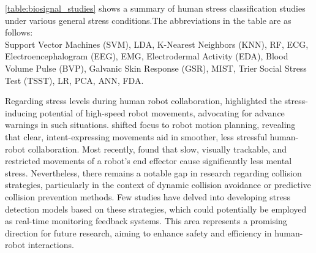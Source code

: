   \autoref{table:biosignal_studies} shows a summary of human stress classification studies under various general stress conditions.The abbreviations in the table are as follows:  \\
  Support Vector Machines (SVM), \gls{LDA}, K-Nearest Neighbors (KNN), \gls{RF}, \gls{ECG}, Electroencephalogram (EEG), \gls{EMG}, Electrodermal Activity (EDA), Blood Volume Pulse (BVP), Galvanic Skin Response (GSR), \gls{MIST}, Trier Social Stress Test (\gls{TSST}), \gls{LR}, \gls{PCA}, \gls{ANN}, \gls{FDA}.
  
  
  Regarding stress levels during human robot collaboration, \textcite{Arai2010-be}highlighted the stress-inducing potential of high-speed robot movements, advocating for advance warnings in such situations. \textcite{Dragan2015-vv} shifted focus to robot motion planning, revealing that clear, intent-expressing movements aid in smoother, less stressful human-robot collaboration. Most recently,\textcite{Lu2022-kj} found that slow, visually trackable, and restricted movements of a robot's end effector cause significantly less mental stress. Nevertheless, there remains a notable gap in research regarding collision strategies, particularly in the context of dynamic collision avoidance or predictive collision prevention methods. Few studies have delved into developing stress detection models based on these strategies, which could potentially be employed as real-time monitoring feedback systems. This area represents a promising direction for future research, aiming to enhance safety and efficiency in human-robot interactions.
  




\begin{comment}
subsection*{Physiological indicators of mental stress}
ome studies focus on reviewing the current state of affairs related to human stress detection. For instance, a review on human stress detection using bio-signals is presented in (Giannakakis et al., 2019). However, a discussion about the psychological, physical, and behavioral measures of human stress is found lacking. Further, publicly available databases for human stress measurement were also not explored. In another study, objective, subjective, physical, and behavioral measures for stress detection, as well as publicly available data used for human stress, are discussed. Another application-specific human stress measurement survey focusing on driver stress level is presented in (Rastgoo et al., 2018). Physical and physiological measures o

Mental Stress Detection using Data from Wearable and Non-Wearable Sensors: A Review 5 human stress for driver stress detection are explored in detail. The limitation of this survey is that it only discusses a specific application i.e., driver stress level, and is not generic.

\subsection*{Robots and stress}
\end{comment}


